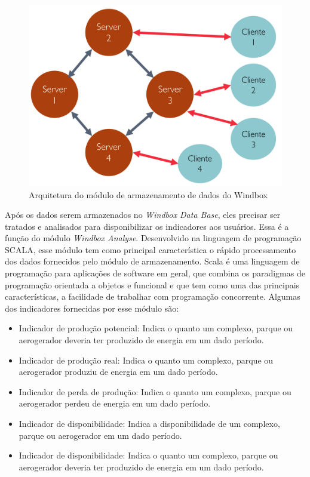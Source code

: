 \begin{figure}[htbp!] \begin{center}
\includegraphics[width=0.75\linewidth]{./figuras/arquitetura-banco-de-dados-windbox}
\caption{Arquitetura do módulo de armazenamento de dados do Windbox}
\label{Fig:moduloArmazenamentoDados}
\end{center} 
\end{figure}

Após os dados serem armazenados no \textit{Windbox Data Base}, eles precisar ser tratados e analisados para disponibilizar os indicadores aos usuários. Essa é a função do módulo \textit{Windbox Analyse}. Desenvolvido na linguagem de programação SCALA, esse módulo tem como principal característica o rápido processamento dos dados fornecidos pelo módulo de armazenamento. Scala é uma linguagem de programação para aplicações de software em geral, que combina os paradigmas de programação orientada a objetos e funcional e que tem como uma das principais características, a facilidade de trabalhar com programação concorrente. Algumas dos indicadores fornecidas por esse módulo são: 

\begin{itemize}
    \item Indicador de produção potencial: Indica o quanto um complexo, parque ou aerogerador deveria ter produzido de energia em um dado período.
    \item Indicador de produção real: Indica o quanto um complexo, parque ou aerogerador produziu de energia em um dado período.
    \item Indicador de perda de produção: Indica o quanto um complexo, parque ou aerogerador perdeu de energia em um dado período.
    \item Indicador de disponibilidade: Indica a disponibilidade de um complexo, parque ou aerogerador em um dado período.
    \item Indicador de disponibilidade: Indica o quanto um complexo, parque ou aerogerador deveria ter produzido de energia em um dado período.
\end{itemize}

